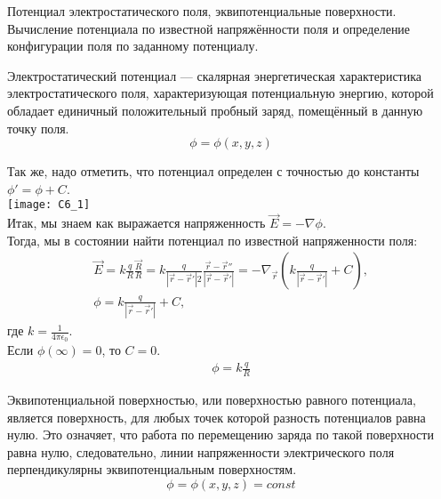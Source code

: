 \documentclass[__main__.tex]{subfiles}
\begin{document}
Потенциал электростатического поля, эквипотенциальные поверхности. Вычисление потенциала по известной напряжённости поля и определение конфигурации поля по заданному потенциалу.\\ 
\begin{definition}
Электростатический потенциал — скалярная энергетическая характеристика электростатического поля, характеризующая потенциальную энергию, которой обладает единичный положительный пробный заряд, помещённый в данную точку поля.$$\phi = \phi(x,y,z)$$
\end{definition}
Так же, надо отметить, что потенциал определен с точностью до константы $\phi ' = \phi + C$.\\
\texttt{[image: C6\_1]}\\
Итак, мы знаем как выражается напряженность $\vec{E} = -\nabla \phi$.\\
Тогда, мы в состоянии найти потенциал по известной напряженности поля:\\
\begin{gather}
\vec{E} = k\frac{q}{R}\frac{\vec{R}}{R} = k \frac{q}{|\vec{r}-\vec{r}'|2}\frac{\vec{r}-\vec{r}''}{|\vec{r}-\vec{r}'|} = -\nabla_{\vec{r}}\left(k\frac{q}{|\vec{r}-\vec{r}'|}+C\right),\\
\phi = k \frac{q}{|\vec{r}-\vec{r}'|}+C,
\end{gather}
где $k = \frac{1}{4 \pi \epsilon_0}$.\\
Если $\phi(\infty) = 0$, то $C = 0$.\\
\begin{gather}
\phi = k\frac{q}{R}
\end{gather}
\begin{definition}
Эквипотенциальной поверхностью, или поверхностью равного потенциала, является поверхность, для любых точек которой разность потенциалов равна нулю. Это означяет, что работа по перемещению заряда по такой поверхности равна нулю, следовательно, линии напряженности электрического поля перпендикулярны эквипотенциальным поверхностям.$$\phi = \phi(x,y,z) = const$$
\end{definition}
\end{document}
